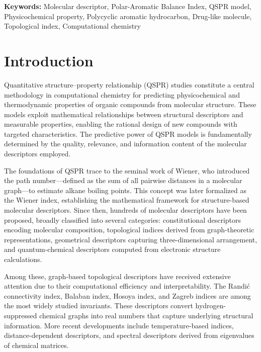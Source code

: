 \documentclass[12pt,a4paper]{article}
\begin{document}
\noindent\textbf{Keywords:} Molecular descriptor, Polar-Aromatic Balance Index, QSPR model, Physicochemical property, Polycyclic aromatic hydrocarbon, Drug-like molecule, Topological index, Computational chemistry

\section{Introduction}

Quantitative structure--property relationship (QSPR) studies\cite{katritzky2001interpretation} constitute a central methodology in computational chemistry for predicting physicochemical and thermodynamic properties of organic compounds from molecular structure. These models exploit mathematical relationships between structural descriptors and measurable properties, enabling the rational design of new compounds with targeted characteristics\cite{tropsha2010best}. The predictive power of QSPR models is fundamentally determined by the quality, relevance, and information content of the molecular descriptors employed\cite{todeschini2009molecular}.

The foundations of QSPR trace to the seminal work of Wiener\cite{wiener1947structural}, who introduced the path number---defined as the sum of all pairwise distances in a molecular graph---to estimate alkane boiling points. This concept was later formalized as the Wiener index, establishing the mathematical framework for structure-based molecular descriptors\cite{gutman2010molecular}. Since then, hundreds of molecular descriptors have been proposed\cite{todeschini2009molecular}, broadly classified into several categories: constitutional descriptors encoding molecular composition\cite{hall1991electrotopological}, topological indices derived from graph-theoretic representations\cite{randic1975characterization, balaban1982highly, gutman2013degree}, geometrical descriptors capturing three-dimensional arrangement\cite{estrada2000characterization}, and quantum-chemical descriptors computed from electronic structure calculations\cite{karelson1996quantum}.

Among these, graph-based topological descriptors have received extensive attention due to their computational efficiency and interpretability\cite{gutman2013degree}. The Randi\'{c} connectivity index\cite{randic1975characterization}, Balaban index\cite{balaban1982highly}, Hosoya index\cite{hosoya1971topological}, and Zagreb indices\cite{gutman1972graph} are among the most widely studied invariants. These descriptors convert hydrogen-suppressed chemical graphs into real numbers that capture underlying structural information\cite{todeschini2009molecular}. More recent developments include temperature-based indices\cite{kulli2019computation, hayat2024novel}, distance-dependent descriptors\cite{hayat2020quality, hayat2020distance}, and spectral descriptors derived from eigenvalues of chemical matrices\cite{hayat2026novel, estrada2000characterization}.
\end{document}
